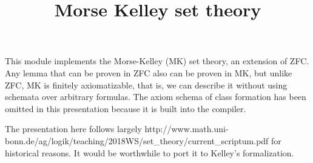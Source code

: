 \documentclass{article}
\title{Morse Kelley set theory}
\author{}
\date{}
\begin{document}

  \maketitle

  This module implements the Morse-Kelley (MK) set theory,
  an extension of ZFC. Any lemma that can be proven in ZFC
  also can be proven in MK, but unlike ZFC, MK is finitely axiomatizable,
  that is, we can describe it without using schemata over arbitrary formulas.
  The axiom schema of class formation has been omitted in this presentation
  because it is built into the compiler.

  The presentation here follows largely http://www.math.uni-bonn.de/ag/logik/teaching/2018WS/set_theory/current_scriptum.pdf
  for historical reasons. It would be worthwhile to port it to Kelley's formalization.
\end{document}
